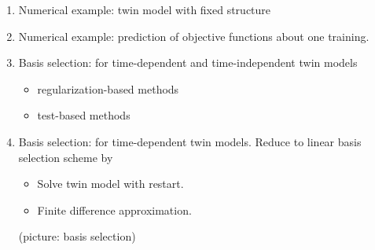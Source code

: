 \documentclass[a4paper,onecolumn]{article}
\theoremstyle{remark}
\begin{document}
\begin{enumerate}
    \item Numerical example: twin model with fixed structure
    \item Numerical example: prediction of objective functions about one training.
    \item Basis selection: for time-dependent and time-independent twin models
          \begin{itemize}
              \item regularization-based methods
              \item test-based methods
          \end{itemize}
    \item Basis selection: for time-dependent twin models.
          Reduce to linear basis selection scheme by 
          \begin{itemize}
              \item Solve twin model with restart.
              \item Finite difference approximation.
          \end{itemize}
          (picture: basis selection)
\end{enumerate}
\end{document}
